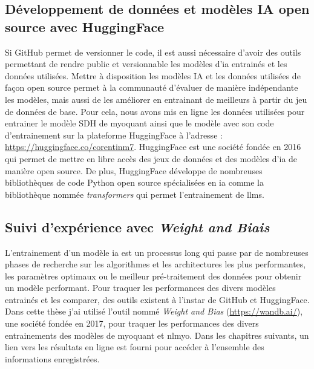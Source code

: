 \subsection{Développement de données et modèles IA open source avec HuggingFace}
Si GitHub permet de versionner le code, il est aussi nécessaire d'avoir des outils permettant de rendre public et versionnable les modèles d'\gls{ia} entrainés et les données utilisées. Mettre à disposition les modèles IA et les données utilisées de façon open source permet à la communauté d'évaluer de manière indépendante les modèles, mais aussi de les améliorer en entrainant de meilleurs à partir du jeu de données de base. Pour cela, nous avons mis en ligne les données utilisées pour entrainer le modèle SDH de \gls{myoquant} ainsi que le modèle avec son code d'entrainement sur la plateforme HuggingFace à l'adresse : \url{https://huggingface.co/corentinm7}. HuggingFace est une société fondée en 2016 qui permet de mettre en libre accès des jeux de données et des modèles d'\gls{ia} de manière open source. De plus, HuggingFace développe de nombreuses bibliothèques de code Python open source spécialisées en \gls{ia} comme la bibliothèque nommée \textit{transformers} qui permet l'entrainement de \gls{llms}.

\subsection{Suivi d'expérience avec \textit{Weight and Biais}}
L'entrainement d'un modèle \gls{ia} est un processus long qui passe par de nombreuses phases de recherche sur les algorithmes et les architectures les plus performantes, les paramètres optimaux ou le meilleur pré-traitement des données pour obtenir un modèle performant. Pour traquer les performances des divers modèles entrainés et les comparer, des outils existent à l'instar de GitHub et HuggingFace. Dans cette thèse j'ai utilisé l'outil nommé \textit{Weight and Bias} (\url{https://wandb.ai/}), une société fondée en 2017, pour traquer les performances des divers entrainements des modèles de \gls{myoquant} et \gls{nlmyo}. Dans les chapitres suivants, un lien vers les résultats en ligne est fourni pour accéder à l'ensemble des informations enregistrées.


